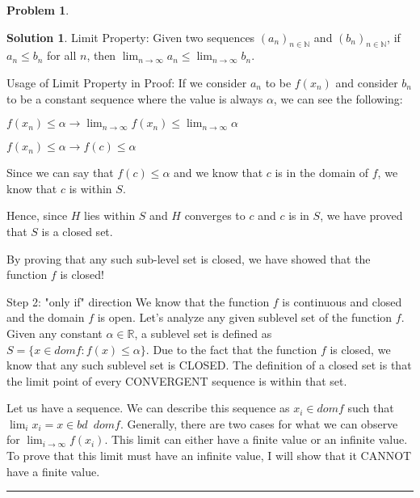 \documentclass{article}
\theoremstyle{definition}
\newtheorem{problem}{Problem}
\def\fline{\rule{0.75\linewidth}{0.5pt}}
\newcommand{\finishline}{\begin{center}\fline\end{center}}
\newtheorem*{solution*}{Solution}
\newenvironment{solution}{\begin{solution*}}{{\finishline} \end{solution*}}
\begin{document}
\begin{problem}
\begin{solution}
Limit Property: \newline 
Given two sequences $(a_n)_{n \in \mathbb{N}}$ and $(b_n)_{n \in \mathbb{N}}$, if $a_n \leq b_n$ for all $n$, then  $\lim_{n\to\infty} a_n \leq \lim_{n\to\infty} b_n$. 

Usage of Limit Property in Proof: \newline 
If we consider $a_n$ to be $f(x_n)$ and consider $b_n$ to be a constant sequence where the value is always $\alpha$, we can see the following: \newline 

$f(x_n) \leq \alpha \rightarrow \lim_{n\to\infty} f(x_n) \leq \lim_{n\to\infty} \alpha$ \newline 

$f(x_n) \leq \alpha \rightarrow f(c) \leq \alpha$ \newline 

Since we can say that $f(c) \leq \alpha$ and we know that $c$ is in the domain of $f$, we know that $c$ is within $S$. \newline 


Hence, since $H$ lies within $S$ and $H$ converges to $c$ and $c$ is in $S$, we have proved that $S$ is a closed set. \newline 


By proving that any such sub-level set is closed, we have showed that the function $f$ is closed! \newline 




Step 2: "only if" direction \newline 
We know that the function $f$ is continuous and closed and the domain $f$ is open. Let's analyze any given sublevel set of the function $f$. Given any constant $\alpha \in \mathbb{R}$, a sublevel set is defined as $S = \{x \in dom f : f(x) \leq \alpha \}$. Due to the fact that the function $f$ is closed, we know that any such sublevel set is CLOSED. The definition of a closed set is that the limit point of every CONVERGENT sequence is within that set. 

Let us have a sequence. We can describe this sequence as $x_i \in dom f$ such that $\lim_{i} x_i = x \in bd \enspace dom f$. Generally, there are two cases for what we can observe for $\lim_{i\to\infty} f(x_i)$. This limit can either have a finite value or an infinite value. To prove that this limit must have an infinite value, I will show that it CANNOT have a finite value. \newline 


\end{solution}
\end{problem}
\end{document}
